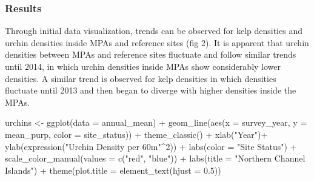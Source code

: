 \documentclass[
]{article}
\newenvironment{Shaded}{\begin{snugshade}}{\end{snugshade}}
\newcommand{\AttributeTok}[1]{\textcolor[rgb]{0.77,0.63,0.00}{#1}}
\newcommand{\DecValTok}[1]{\textcolor[rgb]{0.00,0.00,0.81}{#1}}
\newcommand{\FloatTok}[1]{\textcolor[rgb]{0.00,0.00,0.81}{#1}}
\newcommand{\FunctionTok}[1]{\textcolor[rgb]{0.00,0.00,0.00}{#1}}
\newcommand{\NormalTok}[1]{#1}
\newcommand{\OtherTok}[1]{\textcolor[rgb]{0.56,0.35,0.01}{#1}}
\newcommand{\SpecialCharTok}[1]{\textcolor[rgb]{0.00,0.00,0.00}{#1}}
\newcommand{\StringTok}[1]{\textcolor[rgb]{0.31,0.60,0.02}{#1}}
\begin{document}
\hypertarget{results}{%
\subsubsection{Results}\label{results}}

Through initial data visualization, trends can be observed for kelp
densities and urchin densities inside MPAs and reference sites (fig 2).
It is apparent that urchin densities between MPAs and reference sites
fluctuate and follow similar trends until 2014, in which urchin
densities inside MPAs show considerably lower densities. A similar trend
is observed for kelp densities in which densities fluctuate until 2013
and then began to diverge with higher densities inside the MPAs.

\begin{Shaded}
\begin{Highlighting}[]
\NormalTok{urchins }\OtherTok{\textless{}{-}} \FunctionTok{ggplot}\NormalTok{(}\AttributeTok{data =}\NormalTok{ annual\_mean) }\SpecialCharTok{+}
  \FunctionTok{geom\_line}\NormalTok{(}\FunctionTok{aes}\NormalTok{(}\AttributeTok{x =}\NormalTok{ survey\_year, }\AttributeTok{y =}\NormalTok{ mean\_purp, }\AttributeTok{color =}\NormalTok{ site\_status)) }\SpecialCharTok{+}
  \FunctionTok{theme\_classic}\NormalTok{() }\SpecialCharTok{+}
  \FunctionTok{xlab}\NormalTok{(}\StringTok{"Year"}\NormalTok{)}\SpecialCharTok{+}
  \FunctionTok{ylab}\NormalTok{(}\FunctionTok{expression}\NormalTok{(}\StringTok{"Urchin Density per 60m"}\SpecialCharTok{\^{}}\DecValTok{2}\NormalTok{)) }\SpecialCharTok{+}
  \FunctionTok{labs}\NormalTok{(}\AttributeTok{color =} \StringTok{"Site Status"}\NormalTok{) }\SpecialCharTok{+}
  \FunctionTok{scale\_color\_manual}\NormalTok{(}\AttributeTok{values =} \FunctionTok{c}\NormalTok{(}\StringTok{"red"}\NormalTok{, }\StringTok{"blue"}\NormalTok{)) }\SpecialCharTok{+}
  \FunctionTok{labs}\NormalTok{(}\AttributeTok{title =} \StringTok{"Northern Channel Islands"}\NormalTok{) }\SpecialCharTok{+}
  \FunctionTok{theme}\NormalTok{(}\AttributeTok{plot.title =} \FunctionTok{element\_text}\NormalTok{(}\AttributeTok{hjust =} \FloatTok{0.5}\NormalTok{))}





\end{Highlighting}
\end{Shaded}
\end{document}
